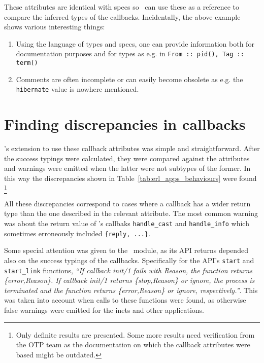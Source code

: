 These attributes are identical with specs so \dr\ can use these as a
reference to compare the inferred types of the callbacks.
Incidentally, the above example shows various interesting things:

\begin{enumerate}
\item Using the language of types and specs, one can provide
  information both for documentation purposes and for types as e.g. in
  \texttt{From :: {pid(), Tag :: term()}}
\item Comments are often incomplete or can easily become obsolete as
  e.g. the \texttt{hibernate} value is nowhere mentioned.
\end{enumerate}

\section{Finding discrepancies in callbacks}
\label{sct:behaviour_discrepancies}

\dr's extension to use these callback attributes was simple and
straightforward. After the success typings were calculated, they were
compared against the attributes and warnings were emitted when the
latter were not subtypes of the former. In this way the discrepancies
shown in Table~\ref{tab:erl_apps_behaviours} were found \footnote{Only
  definite results are presented. Some more results need verification
  from the OTP team as the documentation on which the callback
  attributes were based might be outdated.}



All these discrepancies correspond to cases where a callback has a
wider return type than the one described in the relevant
attribute. The most common warning was about the return value of
\genserv's callbaks \texttt{handle\_cast} and \texttt{handle\_info}
which sometimes erroneously included \texttt{\{reply, ...\}}.

Some special attention was given to the \genserv\ module, as its API
returns depended also on the success typings of the
callbacks. Specifically for the API's \texttt{start} and
\texttt{start\_link} functions, \emph{``If callback init/1 fails with
  Reason, the function returns \{error,Reason\}. If callback init/1
  returns \{stop,Reason\} or ignore, the process is terminated and the
  function returns \{error,Reason\} or ignore, respectively.''}. This
was taken into account when calls to these functions were found, as
otherwise false warnings were emitted for the inets and other
applications.

